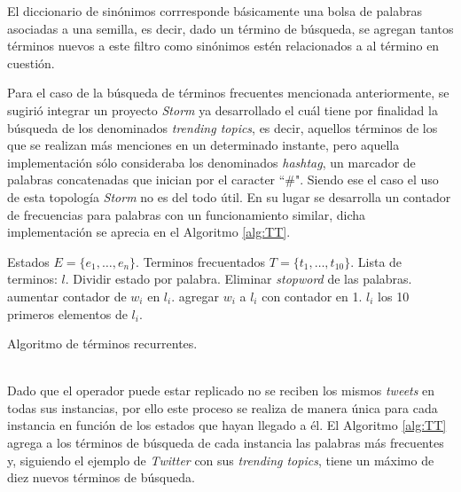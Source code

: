 El diccionario de sinónimos corrresponde básicamente una bolsa de palabras asociadas a una semilla, es decir, dado un término de búsqueda, se agregan tantos términos nuevos a este filtro como sinónimos estén relacionados a al término en cuestión.

Para el caso de la búsqueda de términos frecuentes mencionada anteriormente, se sugirió integrar un proyecto \textit{Storm} ya desarrollado el cuál tiene por finalidad la búsqueda de los denominados \textit{trending topics}, es decir, aquellos términos de los que se realizan más menciones en un determinado instante, pero aquella implementación sólo consideraba los denominados \textit{hashtag}, un marcador de palabras concatenadas que inician por el caracter ``\#". Siendo ese el caso el uso de esta topología \textit{Storm} no es del todo útil. En su lugar se desarrolla un contador de frecuencias para palabras con un funcionamiento similar, dicha implementación se aprecia en el Algoritmo \ref{alg:TT}.\\

\begin{algorithm}[H]
	\begin{algorithmic}
		\REQUIRE Estados $E=\{e_{1}, \dots, e_{n} \}$.
		\ENSURE Terminos frecuentados $T=\{t_{1}, \dots, t_{10} \}$.
		\STATE Lista de terminos: $l$.
			\STATE Dividir estado por palabra.
			\STATE Eliminar \textit{stopword} de las palabras.
					\STATE aumentar contador de $w_{i}$ en $l_{i}$.
				\ELSE
					\STATE agregar $w_{i}$ a $l_{i}$ con contador en 1.
				\ENDIF		
			\ENDFOR
		\ENDFOR
			\RETURN $l_{i}$
		\ELSE
			\RETURN los 10 primeros elementos de $l_{i}$.
		\ENDIF
	\end{algorithmic}
	\caption{Algoritmo de términos recurrentes.}
	\label{alg:TT}
\end{algorithm}\vphantom\\

Dado que el operador puede estar replicado no se reciben los mismos \textit{tweets} en todas sus instancias, por ello este proceso se realiza de manera única para cada instancia en función de los estados que hayan llegado a él. El Algoritmo \ref{alg:TT} agrega a los términos de búsqueda de cada instancia las palabras más frecuentes y, siguiendo el ejemplo de \textit{Twitter} con sus \textit{trending topics}, tiene un máximo de diez nuevos términos de búsqueda.

